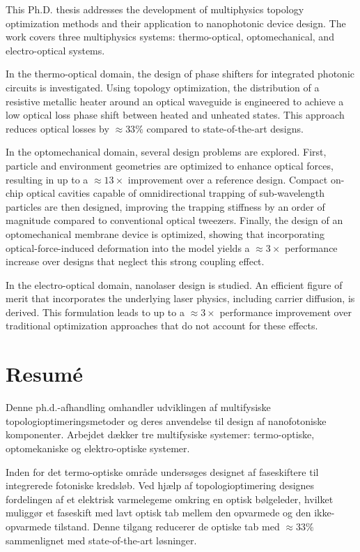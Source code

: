 This Ph.D. thesis addresses the development of multiphysics topology optimization methods and their application to nanophotonic device design. The work covers three multiphysics systems: thermo-optical, optomechanical, and electro-optical systems.

In the thermo-optical domain, the design of phase shifters for integrated photonic circuits is investigated. Using topology optimization, the distribution of a resistive metallic heater around an optical waveguide is engineered to achieve a low optical loss phase shift between heated and unheated states. This approach reduces optical losses by $\approx 33\%$ compared to state-of-the-art designs.

In the optomechanical domain, several design problems are explored. First, particle and environment geometries are optimized to enhance optical forces, resulting in up to a $\approx 13 \times$ improvement over a reference design. Compact on-chip optical cavities capable of omnidirectional trapping of sub-wavelength particles are then designed, improving the trapping stiffness by an order of magnitude compared to conventional optical tweezers. Finally, the design of an optomechanical membrane device is optimized, showing that incorporating optical-force-induced deformation into the model yields a $\approx 3 \times$ performance increase over designs that neglect this strong coupling effect.

In the electro-optical domain, nanolaser design is studied. An efficient figure of merit that incorporates the underlying laser physics, including carrier diffusion, is derived. This formulation leads to up to a $\approx 3\times$ performance improvement over traditional optimization approaches that do not account for these effects.

\chapter*{Resumé}
Denne ph.d.-afhandling omhandler udviklingen af mul\-ti\-fy\-siske to\-po\-lo\-gi\-op\-ti\-merings\-me\-to\-der og deres anvendelse til design af nanofotoniske komponenter. Arbejdet dækker tre multifysiske systemer: termo-optiske, opto\-mekaniske og elektro-optiske systemer.

Inden for det termo-optiske område undersøges designet af fase\-skiftere til integrerede fotoniske kredsløb. Ved hjælp af topologioptimering designes fordelingen af et elektrisk varmelegeme omkring en optisk bølgeleder, hvil\-ket muliggør et faseskift med lavt optisk tab mellem den opvarmede og den ikke-opvarmede tilstand. Denne tilgang reducerer de optiske tab med $\approx 33\%$ sammenlignet med state-of-the-art løsninger.


